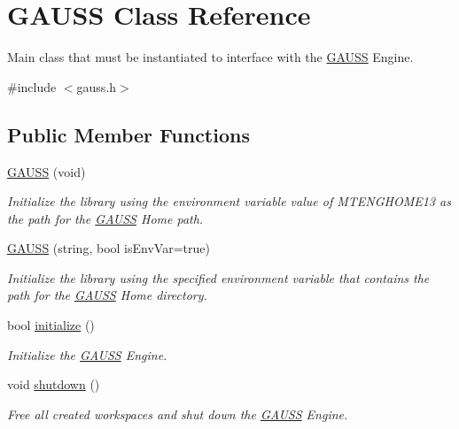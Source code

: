 \hypertarget{class_g_a_u_s_s}{\section{G\-A\-U\-S\-S Class Reference}
\label{class_g_a_u_s_s}
}


Main class that must be instantiated to interface with the \hyperlink{class_g_a_u_s_s}{G\-A\-U\-S\-S} Engine.  




{\ttfamily \#include $<$gauss.\-h$>$}

\subsection*{Public Member Functions}
\begin{DoxyCompactItemize}
\item 
\hyperlink{class_g_a_u_s_s_aba6a26957e7dbcd8f6357d1ca6ff4b90}{G\-A\-U\-S\-S} (void)
\begin{DoxyCompactList}\small\item\em Initialize the library using the environment variable value of {\ttfamily M\-T\-E\-N\-G\-H\-O\-M\-E13} as the path for the \hyperlink{class_g_a_u_s_s}{G\-A\-U\-S\-S} Home path. \end{DoxyCompactList}\item 
\hyperlink{class_g_a_u_s_s_afd3a4f159bc887697d0dc6f1781714ae}{G\-A\-U\-S\-S} (string, bool is\-Env\-Var=true)
\begin{DoxyCompactList}\small\item\em Initialize the library using the specified environment variable that contains the path for the \hyperlink{class_g_a_u_s_s}{G\-A\-U\-S\-S} Home directory. \end{DoxyCompactList}\item 
bool \hyperlink{class_g_a_u_s_s_aad9f7a3a527b9c5961d1cc1b1aa9066c}{initialize} ()
\begin{DoxyCompactList}\small\item\em Initialize the \hyperlink{class_g_a_u_s_s}{G\-A\-U\-S\-S} Engine. \end{DoxyCompactList}\item 
void \hyperlink{class_g_a_u_s_s_a71721c595c12c94616ef414879c95460}{shutdown} ()
\begin{DoxyCompactList}\small\item\em Free all created workspaces and shut down the \hyperlink{class_g_a_u_s_s}{G\-A\-U\-S\-S} Engine. \end{DoxyCompactList}\item 

\end{DoxyCompactItemize}
